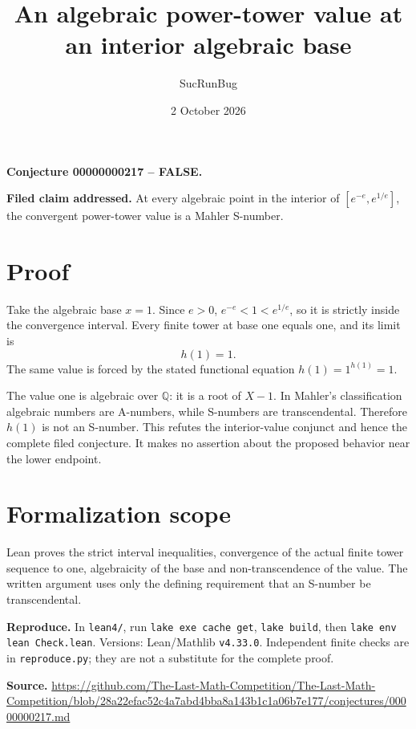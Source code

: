 \documentclass[11pt]{article}
\title{An algebraic power-tower value at an interior algebraic base}
\author{SucRunBug}
\date{2 October 2026}
\begin{document}
\maketitle
\textbf{Conjecture 00000000217 -- FALSE.}

\textbf{Filed claim addressed.} At every algebraic point in the interior of $[e^{-e},e^{1/e}]$, the convergent power-tower value is a Mahler S-number.

\section*{Proof}
Take the algebraic base $x=1$. Since $e>0$, $e^{-e}<1<e^{1/e}$, so it is strictly inside the convergence interval. Every finite tower at base one equals one, and its limit is
\[h(1)=1.\]
The same value is forced by the stated functional equation $h(1)=1^{h(1)}=1$.

The value one is algebraic over $\mathbb Q$: it is a root of $X-1$. In Mahler's classification algebraic numbers are A-numbers, while S-numbers are transcendental. Therefore $h(1)$ is not an S-number. This refutes the interior-value conjunct and hence the complete filed conjecture. It makes no assertion about the proposed behavior near the lower endpoint.

\section*{Formalization scope}
Lean proves the strict interval inequalities, convergence of the actual finite tower sequence to one, algebraicity of the base and non-transcendence of the value. The written argument uses only the defining requirement that an S-number be transcendental.

\textbf{Reproduce.} In \texttt{lean4/}, run \texttt{lake exe cache get},
\texttt{lake build}, then \texttt{lake env lean Check.lean}. Versions:
Lean/Mathlib \texttt{v4.33.0}. Independent finite checks are in
\texttt{reproduce.py}; they are not a substitute for the complete proof.

\textbf{Source.} \url{https://github.com/The-Last-Math-Competition/The-Last-Math-Competition/blob/28a22efac52c4a7abd4bba8a143b1c1a06b7e177/conjectures/00000000217.md}
\end{document}
